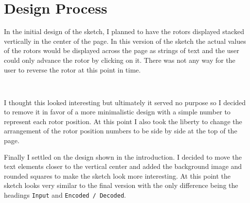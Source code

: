 \documentclass[12pt,a4paper]{article}
\begin{document}
	\section{Design Process}
		In the initial design of the sketch, I planned to have the rotors displayed stacked 
		vertically in the center of the page. In this version of the sketch the actual values 
		of the rotors would be displayed across the page as strings of text and the user could
		only advance the rotor by clicking on it. There was not any way for the user to reverse 
		the rotor at this point in time.\\

		\begin{center}
			\\
		\end{center}
		\newpage
		I thought this looked interesting but ultimately it served no purpose so I decided to 
		remove it in favor of a more minimalistic design with a simple number to represent 
		each rotor position. At this point I also took the liberty to change the arrangement of 
		the rotor position numbers to be side by side at the top of the page.\\
		
		\begin{center}
			\par
		\end{center}
		\vspace{0.5cm}
		Finally I settled on the design shown in the introduction. I decided to move the text 
		elements closer to the vertical center and added the background image and rounded squares 
		to make the sketch look more interesting. At this point the sketch looks very similar to the 
		final version with the only difference being the headings \texttt{Input} and 
		\texttt{Encoded / Decoded}.\\
\end{document}
